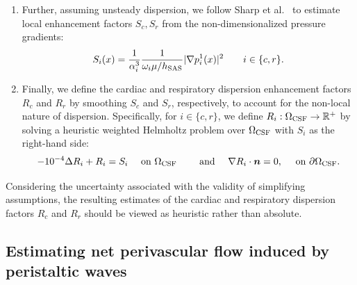 \documentclass[fleqn,10pt]{wlscirep}
\begin{document}
\begin{enumerate}[label=\roman*)]
\begin{equation}
    p^1_i(x) = \left ( 1 + \frac{\alpha_i^2}{8} \right ) p_i^0(x)
    \qquad \text{for } x \in \Omega_{\rm CSF}, \qquad i \in \{c, r\}.
  \end{equation}
  Note that this scaling is based on theoretical considerations on the
  ratio of oscillatory flow to steady flow impedances in a
  tube~\cite[Chap.~4.3.]{van1998cardiovascular}.
\item
  Further, assuming unsteady dispersion, we follow Sharp et
  al.~\cite{sharp2019dispersion} to estimate local enhancement factors
  $S_c, S_r$ from the non-dimensionalized pressure gradients:
  \begin{equation}
    S_i(x) = \frac{1}{\alpha_i^3} \frac{1}{\omega_i \mu/h_{\rm SAS}} | \nabla p_i^1(x) |^2
    \qquad i \in \{c, r\}.
  \end{equation}
\item
  Finally, we define the cardiac and respiratory dispersion
  enhancement factors $R_c$ and $R_r$ by smoothing $S_c$ and $S_r$,
  respectively, to account for the non-local nature of
  dispersion. Specifically, for $i \in \{c, r\}$, we define $R_i :
  \Omega_{\rm CSF} \rightarrow \mathbb{R}^{+}$ by solving a heuristic weighted
  Helmholtz problem over $\Omega_{\rm CSF}$ with $S_i$ as the
  right-hand side:
  \begin{equation}
    - 10^{-4} \Delta R_i + R_i
    = S_i \quad \text{ on } \Omega_{\rm CSF}
    \qquad \text{ and } \quad
    \nabla R_i \cdot \bm n = 0, \quad \text{ on } \partial \Omega_{\rm CSF} .
\end{equation}
\end{enumerate}
Considering the uncertainty associated with the validity of
simplifying assumptions, the resulting estimates of the cardiac and
respiratory dispersion factors $R_c$ and $R_r$ 
should be viewed as heuristic rather than absolute.

\subsection{Estimating net perivascular flow induced by peristaltic waves}
\label{sec:app:peristalsis}
\end{document}
